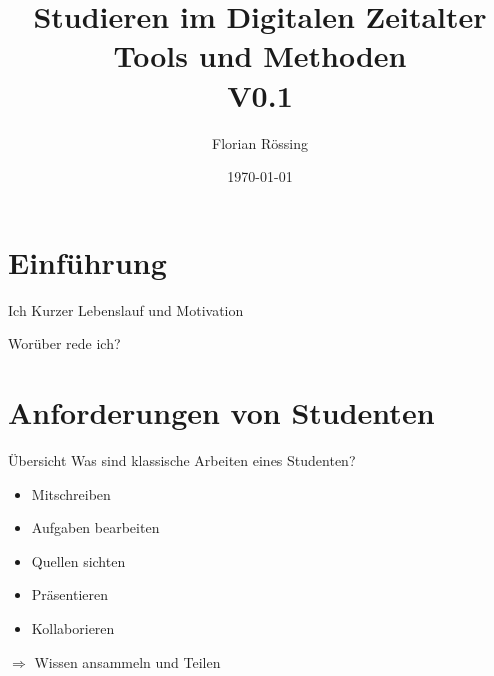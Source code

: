 \documentclass[aspectratio=169]{beamer}
\title{Studieren im Digitalen Zeitalter \\\small Tools und Methoden\\ V0.1}
\author{Florian Rössing}
\date{\today}
\begin{document}
\maketitle

\section{Einführung}
\begin{frame}{Ich}
    Kurzer Lebenslauf und Motivation
\end{frame}

\begin{frame}{Worüber rede ich?}
\tableofcontents[sectionstyle=show,subsectionstyle=show/hide]
\end{frame}

\section{Anforderungen von Studenten}
\begin{frame}{Übersicht}
Was sind klassische Arbeiten eines Studenten?
    \begin{itemize}
        \item Mitschreiben
        \item Aufgaben bearbeiten
        \item Quellen sichten
        \item Präsentieren
        \item Kollaborieren        
    \end{itemize}
    $\Rightarrow$ Wissen ansammeln und Teilen
\end{frame}
\end{document}
